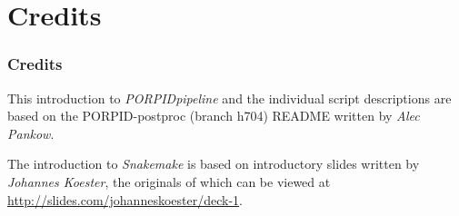 \documentclass{beamer}
\begin{document}
\section{Credits}

\begin{frame}[fragile]
\frametitle{Credits}

\alert<1> 

This introduction to {\em PORPIDpipeline} and the individual script descriptions are based on the 
PORPID-postproc (branch h704)  README written by {\em Alec Pankow}.

\bigskip
\bigskip
The introduction to {\em Snakemake} is based on introductory slides written by {\em Johannes Koester},
the originals of which can be viewed
at \href{http://slides.com/johanneskoester/deck-1}{http://slides.com/johanneskoester/deck-1}.


\end{frame}
\end{document}
